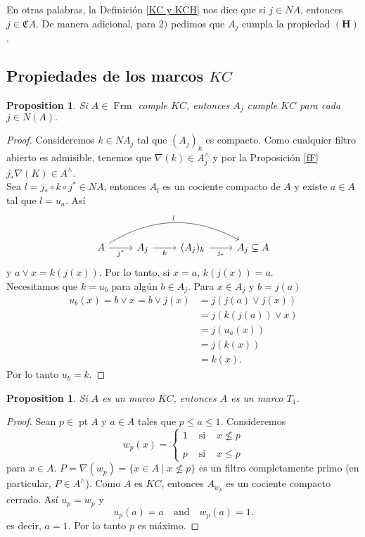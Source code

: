\documentclass[11pt]{amsart}
\DeclareMathOperator{\pt}{pt}
\DeclareMathOperator{\Frm}{Frm}
\theoremstyle{plain}
\newtheorem{prop}[thm]{Proposition}
\theoremstyle{definition}
\begin{document}
En otras palabras, la Definición \ref{KC y KCH} nos dice que si $j\in NA$, entonces $j\in \mathfrak{C}A$. De manera adicional, para $2)$ pedimos que $A_j$ cumpla la propiedad $\mathbf{(H)}$.\\

\subsection{Propiedades de los marcos $KC$}


\begin{prop}\label{KCquout}
    Si $A\in \Frm$ comple $KC$, entonces $A_j$ cumple $KC$ para cada $j\in N(A).$
\end{prop}

\begin{proof} %
Consideremos $k\in NA_j$ tal que $(A_j)_k$ es compacto. 
Como cualquier filtro abierto es admisible, tenemos que $\nabla(k)\in A_j^\wedge$ 
y por la Proposición \ref{fF} $j_*\nabla(K)\in A^\wedge$.\\

Sea $l=j_*\circ  k\circ j^*\in NA$, entonces $A_l$ es un cociente compacto de $A$ y existe $a\in A$ tal que $l=u_a$. Así
\[
\begin{tikzcd}
	A \arrow[r, "j^*"'] \arrow[rrr, "l", bend left] & A_j \arrow[r, "k"'] & (A_j)_k \arrow[r, "j_*"'] & A_j\subseteq A
	\end{tikzcd}\]
y $a\vee x=k(j(x))$. Por lo tanto, si $x=a$, $k(j(x))=a$.\\

Necesitamos que $k=u_b$ para algún $b\in A_j$. Para $x\in A_j$ y $b=j(a)$
\[
\begin{split}
u_b(x)= b\vee x= b\vee j(x)& =j(j(a)\vee j(x))\\
& =j(k(j(a))\vee x)\\
& =j(u_a(x))\\
& =j(k(x))\\	
&=k(x).
\end{split}
\]
Por lo tanto $u_b=k$.
\end{proof}

\begin{prop}\label{KCT1}
Si $A$ es un marco $KC$, entonces $A$ es un marco $T_1$.
\end{prop}

\begin{proof}
Sean $p\in \pt A$ y $a\in A$ tales que $p\leq a\leq 1$. Consideremos 
\[
w_p(x)=\left\{\begin{array}{lcc}
1 & \mbox{ si } & x\nleq p\\
\\
p & \mbox{ si } & x\leq p
\end{array}\right.
\]
para $x\in A$. $P=\nabla(w_p)=\{x\in A\mid x\nleq p\}$ es un filtro completamente primo (en particular, $P\in A^\wedge$). Como $A$ es $KC$, entonces $A_{w_p}$ es un cociente compacto cerrado. Así $u_p=w_p$ y
\[
u_p(a)=a\quad \mbox{and}\quad w_p(a)=1.
\]
es decir, $a=1$. Por lo tanto $p$ es máximo. 
\end{proof}
\end{document}
